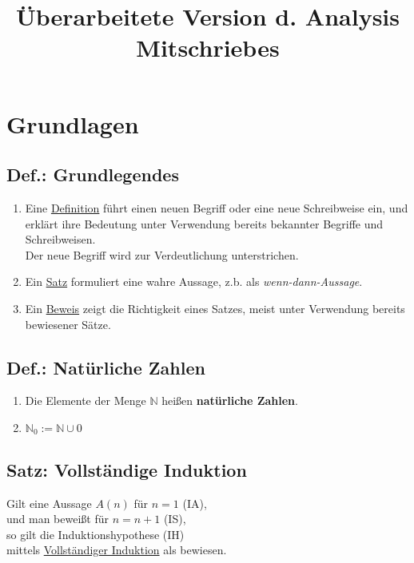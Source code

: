 \documentclass[a4paper,11pt]{article}
\title{Überarbeitete Version d. Analysis Mitschriebes}
\begin{document}
\maketitle
\tableofcontents


\section{Grundlagen}
\subsection{Def.: Grundlegendes}
\begin{enumerate}[label={\alph*)}]
	\item Eine \underline{Definition} führt einen neuen Begriff oder eine neue Schreibweise ein, und erklärt ihre Bedeutung unter Verwendung bereits bekannter Begriffe und Schreibweisen.\\
	Der neue Begriff wird zur Verdeutlichung unterstrichen.
	\item Ein \underline{Satz} formuliert eine wahre Aussage, z.b. als \emph{wenn-dann-Aussage}.
	\item Ein \underline{Beweis} zeigt die Richtigkeit eines Satzes, meist unter Verwendung bereits bewiesener Sätze.
\end{enumerate}
\subsection{Def.: Natürliche Zahlen}
\begin{enumerate}[label={\alph*)}]
	\item Die Elemente der Menge \( \mathbb{N} \) heißen \textbf{natürliche Zahlen}.
	\item \(\mathbb{N}_{0}:=\mathbb{N} \cup 0\)
\end{enumerate}
\subsection{Satz: Vollständige Induktion}
Gilt eine Aussage $A(n)$ für $n=1$ (IA),\\
und man beweißt für $n=n+1$ (IS),\\
so gilt die Induktionshypothese (IH)\\
mittels \underline{Vollständiger Induktion} als bewiesen.
\end{document}
